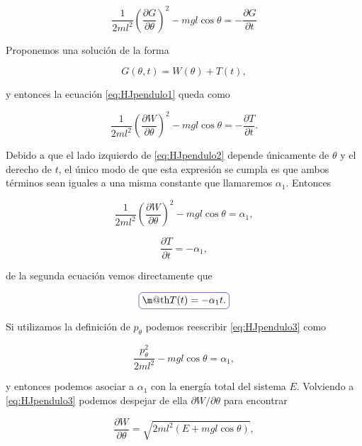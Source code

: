 \documentclass[a4paper,10pt]{article}
\makeatletter
\numberwithin{equation}{section}
\newcommand*{\boxcolor}{blue}
\renewcommand{\boxed}[1]{\textcolor{\boxcolor}{%
\tikz[baseline={([yshift=-1ex]current bounding box.center)}] \node [rectangle, minimum width=1ex,rounded corners,draw] {\normalcolor\m@th$\displaystyle#1$};}}
\makeatother
\begin{document}
\begin{equation}
 \frac{1}{2ml^2} \left(\frac{\partial G}{\partial \theta} \right)^2 - mgl\cos{\theta} 
 = - \frac{\partial G}{\partial t}
 \label{eq:HJpendulo1}
\end{equation}

Proponemos una solución de la forma 

\begin{equation}
 G(\theta,t) = W(\theta) + T(t),
\end{equation}

y entonces la ecuación \eqref{eq:HJpendulo1} queda como 

\begin{equation}
  \frac{1}{2ml^2} \left(\frac{\partial W}{\partial \theta} \right)^2 - mgl\cos{\theta} 
 = - \frac{\partial T}{\partial t}.
 \label{eq:HJpendulo2}
\end{equation}

Debido a que el lado izquierdo de \eqref{eq:HJpendulo2} depende únicamente de $\theta$ 
y el derecho de $t$, el único  modo de que esta expresión se cumpla es que ambos
términos sean iguales a una misma constante que llamaremos $\alpha_1$. Entonces 

\begin{equation}
 \frac{1}{2ml^2} \left(\frac{\partial W}{\partial \theta} \right)^2 - mgl\cos{\theta} = 
 \alpha_1,
 \label{eq:HJpendulo3}
\end{equation}

\begin{equation}
 \frac{\partial T}{\partial t} = - \alpha_1,
\end{equation}

de la segunda ecuación vemos directamente que 

\begin{equation}
 \boxed{T(t) = - \alpha_1t.}
\end{equation}

Si utilizamos la definición de $p_\theta$ podemos reescribir \eqref{eq:HJpendulo3} 
como 

\begin{equation}
 \frac{p_\theta^2}{2ml^2} - mgl\cos{\theta} = 
 \alpha_1,
\end{equation}

y entonces podemos asociar a $\alpha_1$ con la energía total del sistema $E$. Volviendo 
a \eqref{eq:HJpendulo3} podemos despejar de ella $\partial W/\partial \theta$ para 
encontrar 

\begin{equation}
 \frac{\partial W}{\partial \theta} = \sqrt{2ml^2(E + mgl\cos{\theta})},
\end{equation}
\end{document}
